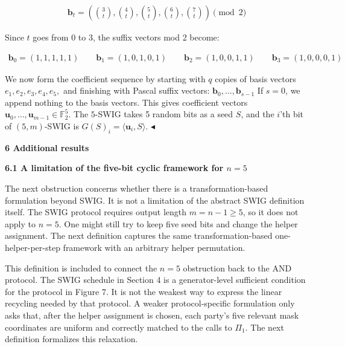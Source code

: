 \documentclass[10pt,a4paper]{article}
\begin{document}
\[\begin{gathered}
\mathbf{b}_{t}=\left(\binom{3}{t},\binom{4}{t},\binom{5}{t},\binom{6}{t},\binom{7}{t}\right)\pmod{2}
\end{gathered}\]


Since $t$ goes from $0$ to $3$, the suffix vectors mod 2 become:\par


\[\begin{gathered}
\mathbf{b}_{0}=(1,1,1,1,1)\qquad\mathbf{b}_{1}=(1,0,1,0,1)\qquad\mathbf{b}_{2}=(1,0,0,1,1)\qquad\mathbf{b}_{3}=(1,0,0,0,1)
\end{gathered}\]


We now form the coefficient sequence by starting with $q$ copies of basis vectors
$e_{1},e_{2},e_{3},e_{4},e_{5},$
and finishing with Pascal suffix vectors:
$\mathbf{b}_{0},\ldots,\mathbf{b}_{s-1}$
If $s=0$, we append nothing to the basis vectors. This gives coefficient vectors
$\mathbf{u}_{0},\ldots,\mathbf{u}_{m-1}\in\mathbb{F}_{2}^{5}$. The $5$-SWIG takes 5 random bits as a seed $S$, and the $i$’th bit of $(5,m)$-SWIG is
$G(S)_{i}=\langle\mathbf{u}_{i},S\rangle$.
$\blacktriangleleft$\par







\par\medskip\noindent\textbf{
6 Additional results}\par




\par\medskip\noindent\textbf{
6.1 A limitation of the five-bit cyclic framework for $n=5$
}\par




The next obstruction concerns whether there is a transformation-based formulation beyond SWIG. It is not a limitation of the abstract SWIG definition itself. The SWIG protocol requires output length $m=n-1\geq 5$, so it does not apply to $n=5$. One might still try to keep five seed bits and change the helper assignment. The next definition captures the same transformation-based one-helper-per-step framework with an arbitrary helper permutation.\par




This definition is included to connect the $n=5$ obstruction back to the AND protocol. The SWIG schedule in Section 4 is a generator-level sufficient condition for the protocol in Figure 7. It is not the weakest way to express the linear recycling needed by that protocol. A weaker protocol-specific formulation only asks that, after the helper assignment is chosen, each party’s five relevant mask coordinates are uniform and correctly matched to the calls to $\Pi_{1}$. The next definition formalizes this relaxation.\par
\end{document}
